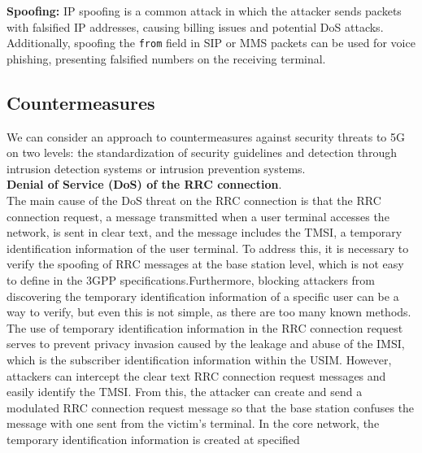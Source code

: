 \documentclass[english]{article}
\begin{document}
\textbf{Spoofing:} IP spoofing is a common attack in which the attacker sends packets with
falsified IP addresses, causing billing issues and potential DoS attacks. Additionally,
spoofing the \texttt{from} field in SIP or MMS packets can be used for voice phishing,
presenting falsified numbers on the receiving terminal.

\subsection{Countermeasures}
We can consider an approach to countermeasures against security threats to 5G
on two levels: the standardization of security guidelines and detection through
intrusion detection systems or intrusion prevention systems. \\[0.2cm]
\textbf{Denial of Service (DoS) of the RRC connection}.\@\\
The main cause of the DoS threat on the RRC connection is that the RRC connection request,
a message transmitted when a user terminal accesses the network, is sent in clear text,
and the message includes the TMSI, a temporary identification information of the user terminal.
To address this, it is necessary to verify the spoofing of RRC messages at the base station level,
which is not easy to define in the 3GPP specifications.\@ Furthermore, blocking attackers from
discovering the temporary identification information of a specific user can be a way to verify,
but even this is not simple, as there are too many known methods. The use of temporary identification
information in the RRC connection request serves to prevent privacy invasion caused by the leakage
and abuse of the IMSI, which is the subscriber identification information within the USIM.
However, attackers can intercept the clear text RRC connection request messages and easily
identify the TMSI. From this, the attacker can create and send a modulated RRC connection
request message so that the base station confuses the message with one sent from the victim's
terminal. In the core network, the temporary identification information is created at specified
\end{document}
